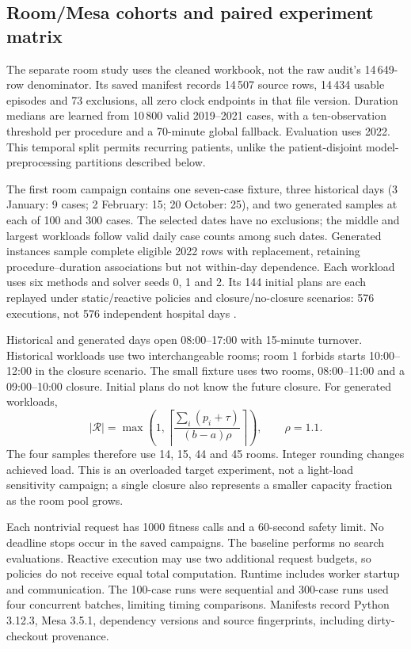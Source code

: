 \subsection{Room/Mesa cohorts and paired experiment matrix}
\label{sec:room-design}

The separate room study uses the cleaned workbook, not the raw audit's
14\,649-row denominator. Its saved manifest records 14\,507 source rows,
14\,434 usable episodes and 73 exclusions, all zero clock endpoints in that
file version. Duration medians are learned from 10\,800 valid 2019--2021
cases, with a ten-observation threshold per procedure and a 70-minute global
fallback. Evaluation uses 2022. This temporal split permits recurring patients, unlike the patient-disjoint
model-preprocessing partitions described below.

The first room campaign contains one seven-case fixture, three historical
days (3 January: 9 cases; 2 February: 15; 20 October: 25), and two generated
samples at each of 100 and 300 cases. The selected dates have no exclusions; the middle and largest workloads
follow valid daily case counts among such dates. Generated instances sample complete eligible 2022
rows with replacement, retaining procedure--duration associations but not
within-day dependence. Each workload uses six methods and solver seeds
0, 1 and 2. Its 144 initial plans are each replayed under static/reactive
policies and closure/no-closure scenarios: 576 executions, not 576 independent
hospital days \citep{group2026roomstudy}.

Historical and generated days open 08:00--17:00 with 15-minute turnover.
Historical workloads use two interchangeable rooms; room 1 forbids starts
10:00--12:00 in the closure scenario. The small fixture uses two rooms,
08:00--11:00 and a 09:00--10:00 closure. Initial plans do not know the future
closure. For generated workloads,
\begin{equation}
 |\mathcal R|=\max\!\left(1,
 \left\lceil\frac{\sum_i(p_i+\tau)}{(b-a)\rho}\right\rceil\right),
 \qquad\rho=1.1.
\end{equation}
The four samples therefore use 14, 15, 44 and 45 rooms. Integer rounding
changes achieved load. This is an overloaded target experiment, not a
light-load sensitivity campaign; a single closure also represents a smaller
capacity fraction as the room pool grows.

Each nontrivial request has 1000 fitness calls and a 60-second safety limit.
No deadline stops occur in the saved campaigns. The baseline performs no
search evaluations. Reactive execution may use two additional request
budgets, so policies do not receive equal total computation. Runtime includes worker startup and communication. The 100-case runs were
sequential and 300-case runs used four concurrent batches, limiting timing
comparisons. Manifests record Python 3.12.3, Mesa 3.5.1, dependency versions
and source fingerprints, including dirty-checkout provenance.

